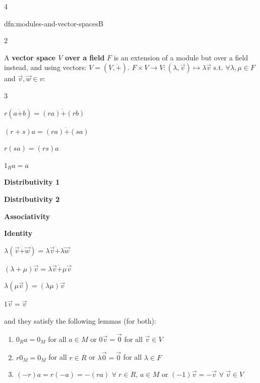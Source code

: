\documentclass[landscape, 8pt]{extarticle}
\begin{document}
\begin{multicols*}{4}
\begin{mdfn}{dfn:modules-and-vector-spaces}{B}
{\begin{multicols}{2}
				
				\columnbreak
				A \textbf{vector space $V$ over a field} $F$ is an extension of a module but over a field instead, and using vectors: $V = (V, \dot{+})$. $F \times V \to V : (\lambda, \vec{v})\mapsto \lambda \vec{v}$ s.t. $\forall \lambda, \mu\in F$ and $\vec{v},\vec{w}\in v$:
			\end{multicols}
		}
			
			\vspace*{-10ex}
			
			\begin{multicols}{3}
				\begin{flushright}
					$r(a \dot{+} b) = (ra) \dot{+} (rb)$
					
					$(r + s)a = (ra) \dot{+} (sa)$
					
					$r (sa) = (rs) a$
					
					$1_{R}a = a$
				\end{flushright}
				
				
				\columnbreak
				\begin{center}
					\textbf{Distributivity 1}
					
					\textbf{Distributivity 2}
					
					\textbf{Associativity}
					
					\textbf{Identity}
				\end{center}
				
				\columnbreak
				
				$\lambda(\vec{v} \dot{+} \vec{w}) = \lambda\vec{v} \dot{+} \lambda \vec{w}$
				
				$(\lambda + \mu)\vec{v} = \lambda \vec{v} \dot{+} \mu \vec{v}$
				
				$\lambda (\mu \vec{v}) = (\lambda \mu) \vec{v}$
				
				$1\vec{v} = \vec{v}$
			\end{multicols}
			
			\vspace*{-7ex}
			
			
			and they satisfy the following lemmas (for both):
			
			\begin{enumerate}
				\setlength\itemsep{0em}
				\item $0_{R} a = 0_{M}$ for all $a\in M$ \quad or \quad $0 \vec{v} = \vec{0}$ for all $\vec{v} \in V$
				\item $r 0_{M} = 0_{M}$ for all $r\in R$ \quad or \quad $\lambda \vec{0} = \vec{0}$ for all $\lambda\in F$
				\item $(-r)a = r(-a) = -(ra)$ $\forall \; r\in R$, $a\in M$ or $(-1)\vec{v} = -\vec{v}$ $\forall \; \vec{v}\in V$
			\end{enumerate}
			

\end{mdfn}
\end{multicols*}
\end{document}
